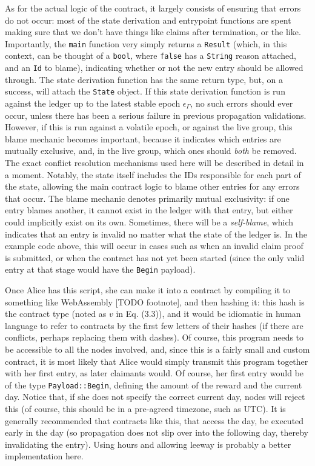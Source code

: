 \documentclass{extreport}
\begin{document}
As for the actual logic of the contract, it largely consists of ensuring that errors do not occur: most of the state derivation and entrypoint functions are spent making sure that we don't have things like claims after termination, or the like. Importantly, the \texttt{main} function very simply returns a \texttt{Result} (which, in this context, can be thought of a \texttt{bool}, where \texttt{false} has a \texttt{String} reason attached, and an \texttt{Id} to blame), indicating whether or not the new entry should be allowed through. The state derivation function has the same return type, but, on a success, will attach the \texttt{State} object. If this state derivation function is run against the ledger up to the latest stable epoch \(\epsilon_\Gamma\), no such errors should ever occur, unless there has been a serious failure in previous propagation validations. However, if this is run against a volatile epoch, or against the live group, this blame mechanic becomes important, because it indicates which entries are mutually exclusive, and, in the live group, which ones should \emph{both} be removed. The exact conflict resolution mechanisms used here will be described in detail in a moment. Notably, the state itself includes the IDs responsible for each part of the state, allowing the main contract logic to blame other entries for any errors that occur. The blame mechanic denotes primarily mutual exclusivity: if one entry blames another, it cannot exist in the ledger with that entry, but either could implicitly exist on its own. Sometimes, there will be a \emph{self-blame}, which indicates that an entry is invalid no matter what the state of the ledger is. In the example code above, this will occur in cases such as when an invalid claim proof is submitted, or when the contract has not yet been started (since the only valid entry at that stage would have the \texttt{Begin} payload).

Once Alice has this script, she can make it into a contract by compiling it to something like WebAssembly [TODO footnote], and then hashing it: this hash is the contract type (noted as \(v\) in Eq. (3.3)), and it would be idiomatic in human language to refer to contracts by the first few letters of their hashes (if there are conflicts, perhaps replacing them with dashes). Of course, this program needs to be accessible to all the nodes involved, and, since this is a fairly small and custom contract, it is most likely that Alice would simply transmit this program together with her first entry, as later claimants would. Of course, her first entry would be of the type \texttt{Payload::Begin}, defining the amount of the reward and the current day. Notice that, if she does not specify the correct current day, nodes will reject this (of course, this should be in a pre-agreed timezone, such as UTC). It is generally recommended that contracts like this, that access the day, be executed early in the day (so propagation does not slip over into the following day, thereby invalidating the entry). Using hours and allowing leeway is probably a better implementation here.
\end{document}
